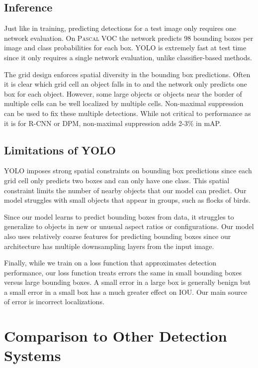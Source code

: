 \subsection{Inference}

Just like in training, predicting detections for a test image only requires one network evaluation. On \textsc{Pascal} VOC the network predicts 98 bounding boxes per image and class probabilities for each box. YOLO is extremely fast at test time since it only requires a single network evaluation, unlike classifier-based methods.

The grid design enforces spatial diversity in the bounding box predictions. Often it is clear which grid cell an object falls in to and the network only predicts one box for each object. However, some large objects or objects near the border of multiple cells can be well localized by multiple cells. Non-maximal suppression can be used to fix these multiple detections. While not critical to performance as it is for R-CNN or DPM, non-maximal suppression adds 2-3\% in mAP.

\subsection{Limitations of YOLO}

YOLO imposes strong spatial constraints on bounding box predictions since each grid cell only predicts two boxes and can only have one class. This spatial constraint limits the number of nearby objects that our model can predict. Our model struggles with small objects that appear in groups, such as flocks of birds.

Since our model learns to predict bounding boxes from data, it struggles to generalize to objects in new or unusual aspect ratios or configurations. Our model also uses relatively coarse features for predicting bounding boxes since our architecture has multiple downsampling layers from the input image.

Finally, while we train on a loss function that approximates detection performance, our loss function treats errors the same in small bounding boxes versus large bounding boxes. A small error in a large box is generally benign but a small error in a small box has a much greater effect on IOU. Our main source of error is incorrect localizations.

\section{Comparison to Other Detection Systems}

